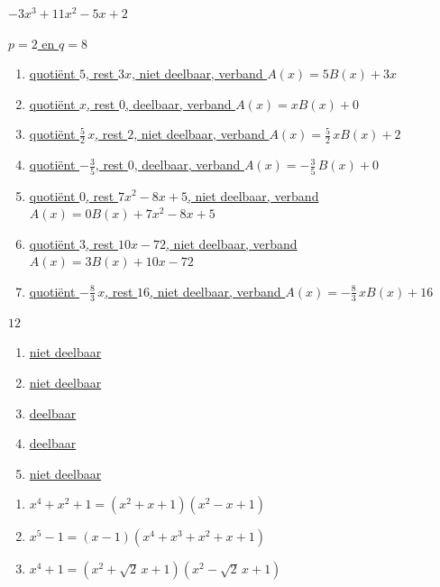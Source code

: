 \documentclass{ximera}
\begin{document}
\begin{oplossing} 
\hyperlink{oef2.3}{$-3x^3+11x^2-5x+2$}
\end{oplossing} 

\begin{oplossing} 
\hyperlink{oef2.4}{$p=2$ en $q=8$}
\end{oplossing} 

\begin{oplossing} 
\begin{enumerate}
\item
\hyperlink{oef2.5}{quoti\"ent $5$, rest $3x$, niet deelbaar, verband $A(x) = 5B(x)+3x$}
\item
\hyperlink{oef2.5}{quoti\"ent $x$, rest $0$, deelbaar, verband $A(x) = xB(x)+0$}
\item
\hyperlink{oef2.5}{quoti\"ent $\frac{5}{2}\,x$, rest $2$, niet deelbaar, verband $A(x) = \frac{5}{2}\,xB(x)+2$}
\item
\hyperlink{oef2.5}{quoti\"ent $-\frac{3}{5}$, rest $0$, deelbaar, verband $A(x) = -\frac{3}{5}\,B(x)+0$}
\item
\hyperlink{oef2.5}{quoti\"ent $0$, rest $7x^2-8x+5$, niet deelbaar, verband $A(x) = 0B(x)+7x^2-8x+5$}
\item
\hyperlink{oef2.5}{quoti\"ent $3$, rest $10x-72$, niet deelbaar, verband $A(x) = 3B(x)+10x-72$}
\item
\hyperlink{oef2.5}{quoti\"ent $-\frac{8}{3}\,x$, rest $16$, niet deelbaar, verband $A(x) = -\frac{8}{3}\,xB(x)+16$}
\end{enumerate}
\end{oplossing} 

\begin{oplossing} 
\hyperlink{oef2.6}{$12$}
\end{oplossing} 

\begin{oplossing} 
\begin{enumerate}
\item
\hyperlink{oef2.7}{niet deelbaar}
\item
\hyperlink{oef2.7}{niet deelbaar}
\item
\hyperlink{oef2.7}{deelbaar}
\item
\hyperlink{oef2.7}{deelbaar}
\item
\hyperlink{oef2.7}{niet deelbaar}
\end{enumerate}
\end{oplossing} 

\begin{oplossing} 
\begin{enumerate}
\item
\hyperlink{oef2.8}{$x^4 + x^2 + 1 = (x^2+x+1)(x^2-x+1)$}
\item
\hyperlink{oef2.8}{$x^5 - 1 = (x-1)(x^4+x^3+x^2+x+1)$}
\item
\hyperlink{oef2.8}{$x^4 + 1 = (x^2+\sqrt{2}\,x+1)(x^2-\sqrt{2}\,x+1)$}
\end{enumerate}
\end{oplossing} 
\end{document}
